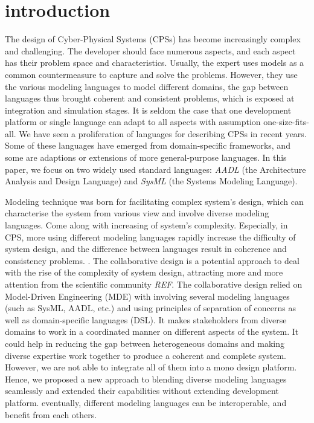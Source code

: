 \section{introduction}
The design of Cyber-Physical Systems (CPSs) has become increasingly complex and challenging. 
The developer should face numerous aspects, and each aspect has their problem space and characteristics. Usually, the expert uses models as a common countermeasure to capture and solve the problems. However, they use the various modeling languages to model different domains, the gap between languages thus brought coherent and consistent problems, which is exposed at integration and simulation stages. It is seldom the case that one development platform or single language can adapt to all aspects with assumption one-size-fits-all. We have seen a proliferation of languages for describing CPSs in recent years. Some of these languages have emerged from domain-specific frameworks, and some are adaptions or extensions of more general-purpose languages. In this paper, we focus on two widely used standard languages: \emph{AADL} (the Architecture Analysis and Design Language) and \emph{SysML} (the Systems Modeling Language). 

Modeling technique was born for facilitating complex system's design, which can characterise the system from various view and involve diverse modeling languages.  Come along with increasing of system's complexity. Especially, in CPS, more using different modeling languages rapidly increase the difficulty of system design, and the difference between languages result in coherence and consistency problems. \cite{franzago2017collaborative}. 
The collaborative design is a potential approach to deal with the rise of the complexity of system design, attracting more and more attention from the scientific community {\color{red}\textit{REF}}. The collaborative design relied on Model-Driven Engineering (MDE) with involving several modeling languages (such as SysML, AADL, etc.) and using principles of separation of concerns as well as domain-specific languages (DSL). It makes stakeholders from diverse domains to work in a coordinated manner on different aspects of the system. It could help in reducing the gap between heterogeneous domains and making diverse expertise work together to produce a coherent and complete system. However, we are not able to integrate all of them into a mono design platform. Hence, we proposed a new approach to blending diverse modeling languages seamlessly and extended their capabilities without extending development platform. eventually, different modeling languages can be interoperable, and benefit from each others. 

